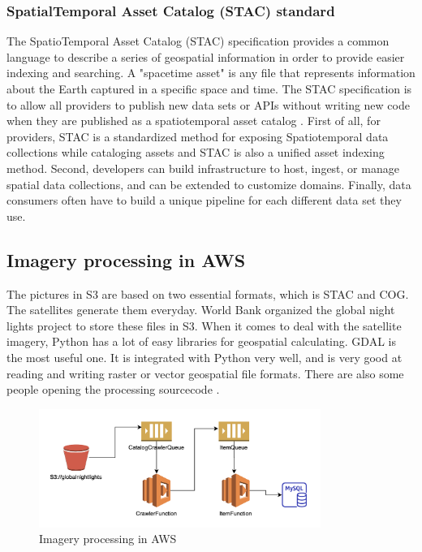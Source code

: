 \documentclass[conference]{IEEEtran}
\begin{document}
\subsubsection{Spatial\-Temporal Asset Catalog (STAC) standard}

The SpatioTemporal Asset Catalog (STAC) specification provides a common language to describe a series of geospatial 
information in order to provide easier indexing and searching. A "space\-time asset" is any file that represents information 
about the Earth captured in a specific space and time. The STAC specification is to allow all providers to publish new data 
sets or APIs without writing new code when they are published as a spatiotemporal asset catalog \cite{SpatioTe21:online}. 
First of all, for providers, STAC is a standardized method for exposing Spatio\-temporal data collections while cataloging 
assets and STAC is also a unified asset indexing method. Second, developers can build infrastructure to host, ingest, or 
manage spatial data collections, and can be extended to customize domains. Finally, data consumers often have to build a 
unique pipeline for each different data set they use.


\subsection{Imagery processing in AWS}

The pictures in S3 are based on two essential formats, which is STAC and COG. The satellites generate them everyday. 
World Bank organized the global night lights project to store these files in S3. When it comes to deal with the satellite 
imagery, Python has a lot of easy libraries for geospatial calculating. GDAL is the most useful one. 
It is integrated with Python very well, and is very good at reading and writing raster or vector geospatial file formats.
There are also some people opening the processing sourcecode \cite{Howtopro5:online}.

\begin{figure}[htbp]
    \centerline{\includegraphics[width=260pt]{images/dataprocess.png}}
    \caption{Imagery processing in AWS}
    \label{fig4}
\end{figure}
\end{document}
